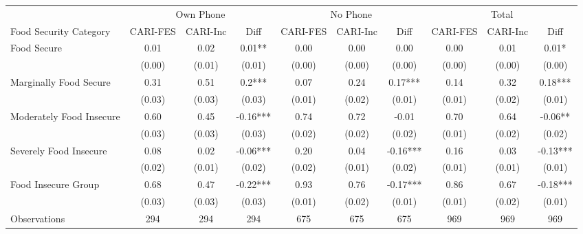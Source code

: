 \begin{tabular}{l*{9}c}
	\hline\hline
		\multicolumn{1}{c}{}     & \multicolumn{3}{c}{Own Phone} & \multicolumn{3}{c}{No Phone} & \multicolumn{3}{c}{Total}     \\
		Food Security Category   & CARI-FES  & CARI-Inc & Diff     & CARI-FES & CARI-Inc & Diff     & CARI-FES & CARI-Inc & Diff     \\ 	
		\hline
		Food Secure              & 0.01      & 0.02     & 0.01**   & 0.00     & 0.00     & 0.00     & 0.00     & 0.01     & 0.01*    \\
		& (0.00)    & (0.01)   & (0.01)   & (0.00)   & (0.00)   & (0.00)   & (0.00)   & (0.00)   & (0.00)   \\
		Marginally Food Secure & 0.31      & 0.51     & 0.2***   & 0.07     & 0.24     & 0.17***  & 0.14     & 0.32     & 0.18***  \\
		& (0.03)    & (0.03)   & (0.03)   & (0.01)   & (0.02)   & (0.01)   & (0.01)   & (0.02)   & (0.01)   \\
		Moderately Food Insecure  & 0.60       & 0.45     & -0.16*** & 0.74     & 0.72     & -0.01    & 0.70     & 0.64     & -0.06**  \\
		& (0.03)    & (0.03)   & (0.03)   & (0.02)   & (0.02)   & (0.02)   & (0.01)   & (0.02)   & (0.02)   \\
		Severely Food Insecure       & 0.08      & 0.02     & -0.06*** & 0.20     & 0.04     & -0.16*** & 0.16     & 0.03     & -0.13*** \\
		& (0.02)    & (0.01)   & (0.02)   & (0.02)   & (0.01)   & (0.02)   & (0.01)   & (0.01)   & (0.01)   \\
		Food Insecure Group      & 0.68      & 0.47     & -0.22*** & 0.93     & 0.76     & -0.17*** & 0.86     & 0.67     & -0.18*** \\
		\multicolumn{1}{c}{}     & (0.03)    & (0.03)   & (0.03)   & (0.01)   & (0.02)   & (0.01)   & (0.01)   & (0.02)   & (0.01)   \\
		\hline
		Observations             & 294       & 294      & 294      & 675      & 675      & 675      & 969      & 969      & 969       \\
		\hline\hline
\end{tabular}
